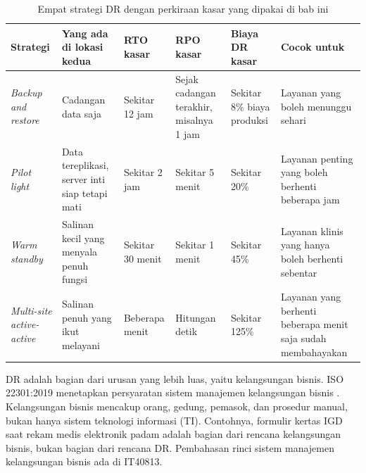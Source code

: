 \begin{table}[!htb]
  \centering
  \caption{Empat strategi DR dengan perkiraan kasar yang dipakai di bab ini}
  \label{tab:ch12-strategi}
  \footnotesize
  \begin{tabularx}{\textwidth}{>{\raggedright\arraybackslash}p{2.2cm} >{\raggedright\arraybackslash}X >{\raggedright\arraybackslash}p{1.5cm} >{\raggedright\arraybackslash}p{1.6cm} >{\raggedright\arraybackslash}p{1.6cm} >{\raggedright\arraybackslash}X}
    \hline
    \textbf{Strategi} & \textbf{Yang ada di lokasi kedua} & \textbf{RTO kasar} &
      \textbf{RPO kasar} & \textbf{Biaya DR kasar} & \textbf{Cocok untuk} \\ \hline
    \textit{Backup and restore} & Cadangan data saja & Sekitar 12 jam & Sejak cadangan terakhir,
      misalnya 1 jam & Sekitar 8\% biaya produksi & Layanan yang boleh menunggu sehari \\ \hline
    \textit{Pilot light} & Data tereplikasi, server inti siap tetapi mati & Sekitar 2 jam &
      Sekitar 5 menit & Sekitar 20\% & Layanan penting yang boleh berhenti beberapa jam \\ \hline
    \textit{Warm standby} & Salinan kecil yang menyala penuh fungsi & Sekitar 30 menit & Sekitar
      1 menit & Sekitar 45\% & Layanan klinis yang hanya boleh berhenti sebentar \\ \hline
    \textit{Multi-site active-active} & Salinan penuh yang ikut melayani & Beberapa menit &
      Hitungan detik & Sekitar 125\% & Layanan yang berhenti beberapa menit saja sudah
      membahayakan \\ \hline
  \end{tabularx}
\end{table}

DR adalah bagian dari urusan yang lebih luas, yaitu kelangsungan bisnis. ISO 22301:2019 menetapkan
persyaratan sistem manajemen kelangsungan bisnis \cite{c12-iso22301}. Kelangsungan bisnis mencakup
orang, gedung, pemasok, dan prosedur manual, bukan hanya sistem teknologi informasi (TI). Contohnya,
formulir kertas IGD saat rekam medis elektronik padam adalah bagian dari rencana kelangsungan
bisnis, bukan bagian dari rencana DR. Pembahasan rinci sistem manajemen kelangsungan bisnis ada di
IT40813.

